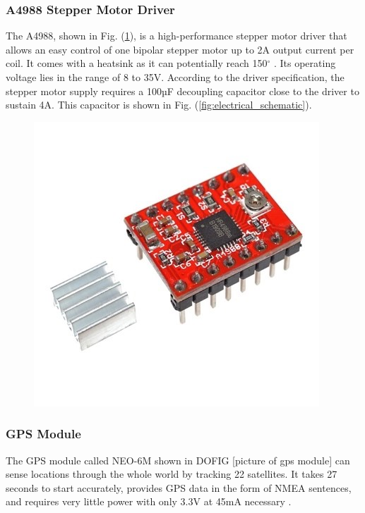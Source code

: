 \documentclass[11pt,landscape]{article}
\begin{document}
\begin{multicols}{3}
\subsubsection{A4988 Stepper Motor Driver}
The A4988, shown in Fig. (\ref{fig:stepper_driver}), is a high-performance
stepper motor driver that allows an easy control of one bipolar stepper motor up
to 2A output current per coil. It comes with a heatsink as it can potentially
reach 150$^{\circ}$ \cite{stepper_driver}.
Its operating voltage lies in the range of 8 to 35V. According to the driver
specification, the stepper motor supply requires a 100µF decoupling capacitor
close to the driver to sustain 4A. This capacitor is shown in Fig.
(\ref{fig:electrical_schematic}).

\begin{figure}[H]
    \begin{center}
    \includegraphics[]{stepper_driver.jpg}
    \label{fig:stepper_driver}
    \end{center}
\end{figure}

\subsubsection{GPS Module}
The GPS module called NEO-6M shown in DOFIG [picture of gps module] can sense
locations through the whole world by tracking 22 satellites. It takes 27 seconds
to start accurately, provides GPS data in the form of NMEA sentences, and
requires very little power with only 3.3V at 45mA necessary \cite{neo_gps}.


\end{multicols}
\end{document}
